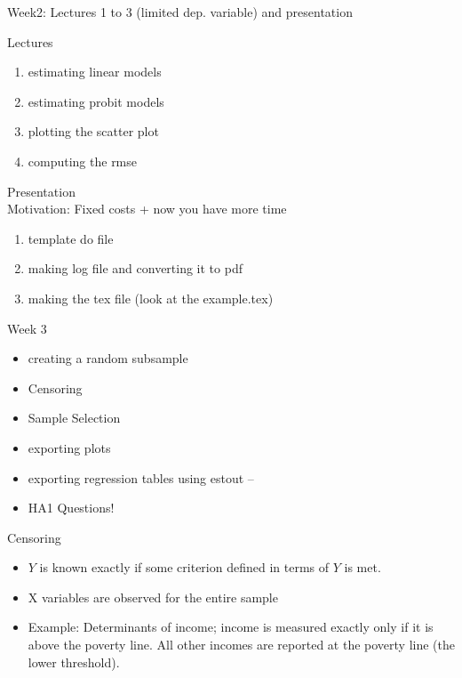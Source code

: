 \documentclass{beamer}
\begin{document}
\begin{frame}{Week2: Lectures 1 to 3 (limited dep. variable) and presentation}

Lectures
\begin{enumerate}[1.]
\item estimating linear models
\item estimating probit models
\item plotting the scatter plot
\item computing the rmse
\end{enumerate}

Presentation
\\
Motivation: Fixed costs + now you have more time
\\
\begin{enumerate}[1.]
\item template do file
\item making log file and converting it to pdf
\item making the tex file (look at the example.tex)
\end{enumerate}

\end{frame}
\begin{frame}{Week 3}
\begin{itemize}
\item creating a random subsample 
\item Censoring 
\item Sample Selection
\item exporting plots
\item exporting regression tables using estout -- %
\item HA1 Questions!
\end{itemize}
\end{frame}

\begin{frame}{Censoring}
\begin{itemize}
\item $Y$ is known exactly if some criterion defined in terms of $Y$ is met.
\item X variables are observed for the entire sample
\item Example: Determinants of income; income is measured exactly only if it 
is above the poverty line. All other incomes are reported at the poverty line 
(the lower threshold).
\end{itemize}
\end{frame}
\end{document}
